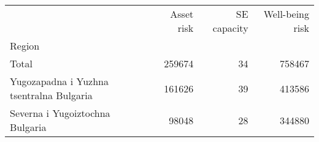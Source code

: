 \begin{tabular}{lrrr}
\toprule
{} &  Asset risk &  SE capacity &  Well-being risk \\
Region                                   &             &              &                  \\
\midrule
Total                                    &      259674 &           34 &           758467 \\
Yugozapadna i Yuzhna tsentralna Bulgaria &      161626 &           39 &           413586 \\
Severna i Yugoiztochna Bulgaria          &       98048 &           28 &           344880 \\
\bottomrule
\end{tabular}
